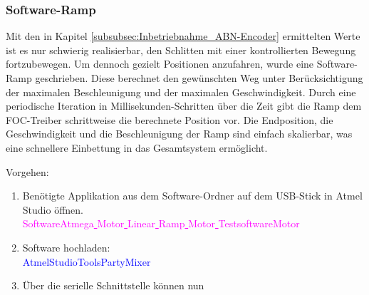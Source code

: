 \subsubsection{Software-Ramp}
\label{subsubsec:Software_Ramp}

Mit den in Kapitel \ref{subsubsec:Inbetriebnahme_ABN-Encoder} ermittelten Werte ist es nur schwierig realisierbar, den Schlitten mit einer kontrollierten Bewegung fortzubewegen. Um dennoch gezielt Positionen anzufahren, wurde eine Software-Ramp geschrieben. Diese berechnet den gewünschten Weg unter Berücksichtigung der maximalen Beschleunigung und der maximalen Geschwindigkeit. Durch eine periodische Iteration in Millisekunden-Schritten über die Zeit gibt die Ramp dem FOC-Treiber schrittweise die berechnete Position vor. Die Endposition, die Geschwindigkeit und die Beschleunigung der Ramp sind einfach skalierbar, was eine schnellere Einbettung in das Gesamtsystem ermöglicht.


Vorgehen:
\begin{enumerate}
\item Benötigte Applikation aus dem Software-Ordner auf dem USB-Stick in Atmel Studio öffnen.\\
\textcolor{magenta}{Software\textrightarrow Atmega\underline{ }Motor\underline{ }Linear\underline{ }Ramp\underline{ }Motor\underline{ }Testsoftware\textrightarrow Motor}\\

\item Software hochladen:\\
\textcolor{blue}{AtmelStudio\textrightarrow Tools\textrightarrow PartyMixer}\\

\item Über die serielle Schnittstelle können nun 

\end{enumerate}
